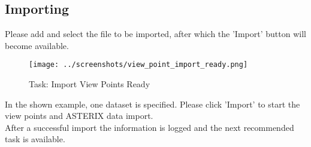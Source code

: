 \subsection{Importing}

Please add and select the file to be imported, after which the 'Import' button will become available. \\

\begin{figure}[H]
    \texttt{[image: ../screenshots/view\_point\_import\_ready.png]}
  \caption{Task: Import View Points Ready}
\end{figure}

In the shown example, one dataset is specified. Please click 'Import' to start the view points and ASTERIX data import. \\

After a successful import the information is logged and the next recommended task is available.

